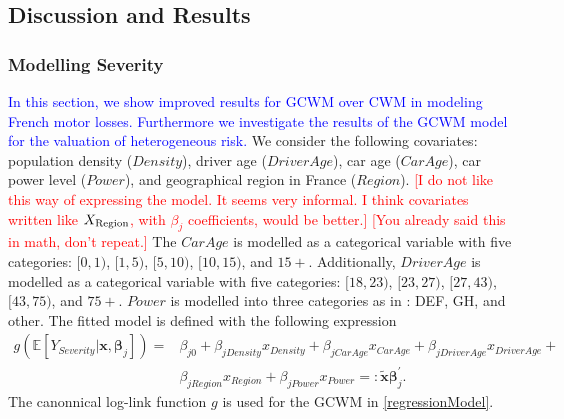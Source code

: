 \documentclass[11pt,letterpaper]{article}
\numberwithin{equation}{section}
\numberwithin{equation}{section}
\numberwithin{equation}{section}
\newcommand{\xTilda}{\tilde{\bm{x}}}
\begin{document}
\subsection{Discussion and Results}
\subsubsection{Modelling Severity}
\textcolor{blue}{In this section, we show improved results for GCWM  over CWM in modeling French motor losses. Furthermore we investigate the results of the GCWM model for the valuation of heterogeneous risk.} We consider the following covariates: population density ($Density$), driver age ($DriverAge$), car age ($CarAge$), car power level ($Power$),  and geographical region in France ($Region$). %
\textcolor{red}{[I do not like this way of expressing the model. It seems very informal. I think covariates written like $X_{\tiny \text{Region}}$, with $\beta_j$ coefficients, would be better.]}
 \textcolor{red}{[You already said this in math, don't repeat.]} 
The
$CarAge$ is modelled as a categorical variable with five categories: $[0,1)$, $[1,5)$, $[5,10)$, $[10,15)$, and $15+$. Additionally, $DriverAge$ is modelled as a categorical variable with five categories: $[18,23)$, $[23,27)$, $[27,43)$, $[43,75)$, and $75+$. $Power$ is modelled into three categories as in \cite{Charpentier:2014}:
DEF, GH, and other. The fitted model is defined with the following expression
\begin{align}
g(\mathbb{E}\left[Y_{Severity}|\bm{x},  \bm{\beta}_j  \right]) = 
 & \beta_{j0} +  \beta_{jDensity}x_{Density}+ \beta_{jCar Age} x_{Car Age}+ \beta_{jDriver Age} x_{Driver Age} + \nonumber \\ &  \beta_{jRegion} x_{Region} + \beta_{jPower} x_{Power} \label{regressionModel}  =: \bm{\xTilda} \bm{\beta}_j^{'}.
\end{align}
The canonnical log-link function $g$ is used for the GCWM in \eqref{regressionModel}. 
\end{document}
